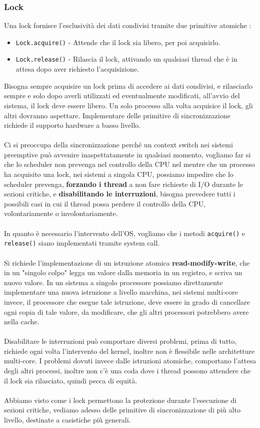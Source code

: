 \documentclass[12pt, letterpaper]{article}
\newcommand{\code}[1]{\colorbox{light-gray}{\texttt{#1}}}
\newcommand{\acc}{\\\hphantom{}\\}
\begin{document}
\subsubsection{Lock}
Una lock fornisce l'esclusività dei dati condivisi tramite due primitive atomiche : \begin{itemize}
    \item \code{Lock.acquire()} - Attende che il lock sia libero, per poi acquisirlo.
    \item \code{Lock.release()} - Rilascia il lock, attivando un qualsiasi thread che è in attesa dopo aver richiesto 
    l'acquisizione.
\end{itemize}
Bisogna sempre acquisire un lock prima di accedere ai dati condivisi, e rilasciarlo sempre e solo dopo averli utilizzati 
ed eventualmente modificati, all'avvio del sistema, il lock deve essere libero. Un solo processo alla volta acquisice il lock, 
gli altri dovranno aspettare. Implementare delle primitive di sincronizzazione richiede il supporto hardware 
a basso livello.\acc 
Ci si preoccupa della sincronizzazione perché un context switch nei sistemi preemptive può avvenire 
inaspettatamente in qualsiasi momento, vogliamo far si che lo scheduler non prevenga nel controllo della CPU nel mentre 
che un processo ha acquisito una lock, nei sistemi a singola CPU, possiamo impedire che lo scheduler prevenga, 
\textbf{forzando i thread} a non fare richieste di I/O durante le sezioni critiche, e 
\textbf{disabilitando le interruzioni}, bisogna prevedere tutti i possibili casi in cui il thread possa perdere 
il controllo della CPU, volontariamente o involontariamente.\acc 
In quanto è necessario l'intervento dell'OS, vogliamo che i metodi \code{acquire()} e \code{release()} 
siano implementati tramite system call.\acc 
Si richiede l'implementazione di un istruzione atomica \textbf{read-modify-write}, che in un "singolo colpo" legga un valore 
dalla memoria in un registro, e scriva un nuovo valore. In un sistema a singolo processore possiamo direttamente implementare 
una nuova istruzione a livello macchina, nei sistemi multi-core invece, il processore che esegue tale istruzione, deve 
essere in grado di cancellare ogni copia di tale valore, da modificare, che gli altri processori potrebbero avere nella cache.
\acc Disabilitare le interruzioni può comportare diversi problemi, prima di tutto, richiede ogni volta l'intervento 
del kernel, inoltre non è flessibile nelle architetture multi-core.  I problemi dovuti invece dalle istruzioni atomiche, 
comportano l'attesa degli altri processi, inoltre non c'è una coda dove i thread possono attendere che il lock sia 
rilasciato, quindi pecca di equità. \acc Abbiamo visto come i lock permettono la protezione durante l'esecuzione 
di sezioni critiche, vediamo adesso delle primitive di sincronizzazione di più alto livello, destinate 
a casistiche più generali. 
\end{document}
